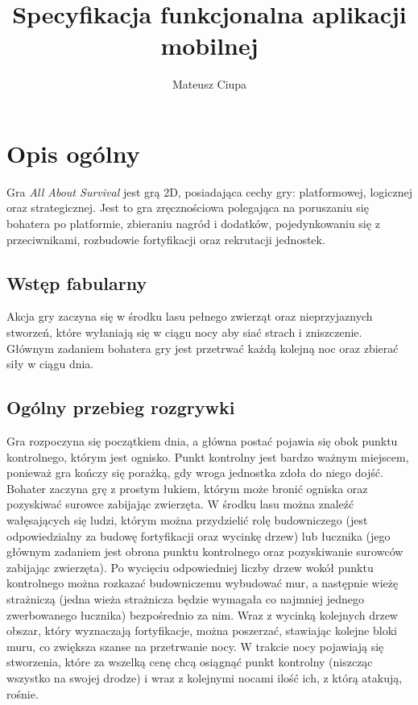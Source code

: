 \documentclass[12pt, a4paper]{article}
\author{Mateusz Ciupa}
\title{Specyfikacja funkcjonalna aplikacji mobilnej}
\begin{document}
\maketitle
\date
\tableofcontents

\section{Opis ogólny}
Gra \textit{All About Survival} jest grą 2D, posiadająca cechy gry: platformowej, logicznej oraz strategicznej. Jest to gra zręcznościowa polegająca na poruszaniu się bohatera po platformie, zbieraniu nagród i dodatków, pojedynkowaniu się z przeciwnikami, rozbudowie fortyfikacji oraz rekrutacji jednostek. 

\subsection{Wstęp fabularny}
Akcja gry zaczyna się w środku lasu pełnego zwierząt oraz nieprzyjaznych stworzeń, które wyłaniają się w ciągu nocy aby siać strach i zniszczenie. Głównym zadaniem bohatera gry jest przetrwać każdą kolejną noc oraz zbierać siły w ciągu dnia.

\subsection{Ogólny przebieg rozgrywki}

Gra rozpoczyna się początkiem dnia, a główna postać pojawia się obok punktu kontrolnego, którym jest ognisko. Punkt kontrolny jest bardzo ważnym miejscem, ponieważ gra kończy się porażką, gdy wroga jednostka zdoła do niego dojść. Bohater zaczyna grę z prostym łukiem, którym może bronić ogniska oraz pozyskiwać surowce zabijając zwierzęta. W środku lasu można znaleźć wałęsających się ludzi, którym można przydzielić rolę budowniczego (jest odpowiedzialny za budowę fortyfikacji oraz wycinkę drzew) lub łucznika (jego głównym zadaniem jest obrona punktu kontrolnego oraz pozyskiwanie surowców zabijając zwierzęta). Po wycięciu odpowiedniej liczby drzew wokół punktu kontrolnego można rozkazać budowniczemu wybudować mur, a następnie wieżę strażniczą (jedna wieża strażnicza będzie wymagała co najmniej jednego zwerbowanego łucznika) bezpośrednio za nim. Wraz z wycinką kolejnych drzew obszar, który wyznaczają fortyfikacje, można poszerzać, stawiając kolejne bloki muru, co zwiększa szanse na przetrwanie nocy. W trakcie nocy pojawiają się stworzenia, które za wszelką cenę chcą osiągnąć punkt kontrolny (niszcząc wszystko na swojej drodze) i wraz z kolejnymi nocami ilość ich, z którą atakują, rośnie. 
\end{document}
